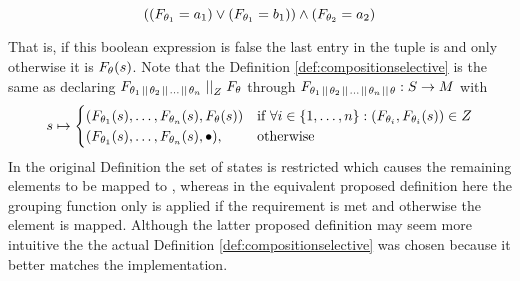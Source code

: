 \documentclass[preview]{standalone}
\begin{document}
\[
	((\grpfct[\viewppty_1] = a_1) \lor (\grpfct[\viewppty_1] = b_1)) \land (\grpfct[\viewppty_2] = a_2)
\]

That is, if this boolean expression is false the last entry in the tuple is \remelem and only otherwise it is $\grpfct(\state)$. Note that the Definition \ref{def:compositionselective} is the same as declaring $\grpfct[{\viewppty_1 \pll \viewppty_2 \pll \dots \pll \viewppty_n}] \compselect \grpfct$ through $\grpfct[{\viewppty_1 \pll \viewppty_2 \pll \dots \pll \viewppty_n} \pll \viewppty]: \states \to \arbset$ with
\[
\state \mapsto
\begin{cases}
	(\grpfct[\viewppty_1](\state), \dots, \grpfct[\viewppty_n](\state),  \grpfct[\viewppty](\state))				& \text{if } \forall i \in \{1, \dots, n\} : (\grpfct[\viewppty_i], \grpfct[\viewppty_i](\state)) \in \compselectset \\ 		
	(\grpfct[\viewppty_1](\state), \dots, \grpfct[\viewppty_n](\state),  \remelem),          	& \text{otherwise}
\end{cases}
\]
In the original Definition the set of states \smstates is restricted which causes the remaining elements to be mapped to \remelem, whereas in the equivalent proposed definition here the grouping function only is applied if the requirement is met and otherwise the element \remelem is mapped. Although the latter proposed definition may seem more intuitive the the actual Definition \ref{def:compositionselective} was chosen because it better matches the implementation.
\end{document}
